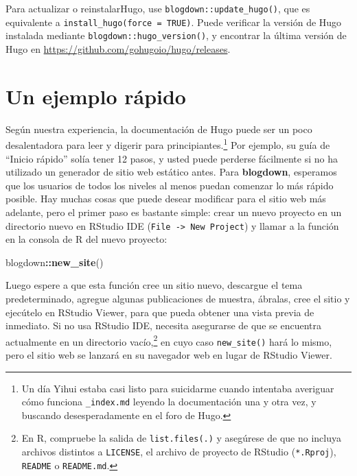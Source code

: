 \documentclass[12pt,]{krantz}
\makeatletter
\newenvironment{Shaded}{\begin{snugshade}}{\end{snugshade}}
\newcommand{\KeywordTok}[1]{\textcolor[rgb]{0.13,0.29,0.53}{\textbf{#1}}}
\newcommand{\NormalTok}[1]{#1}
\newcommand{\OperatorTok}[1]{\textcolor[rgb]{0.81,0.36,0.00}{\textbf{#1}}}
\newenvironment{kframe}{%
\medskip{}
\setlength{\fboxsep}{.8em}
 \def\at@end@of@kframe{}%
 \ifinner\ifhmode%
  \def\at@end@of@kframe{\end{minipage}}%
  \begin{minipage}{\columnwidth}%
 \fi\fi%
 \def\FrameCommand##1{\hskip\@totalleftmargin \hskip-\fboxsep
 \colorbox{shadecolor}{##1}\hskip-\fboxsep
     \hskip-\linewidth \hskip-\@totalleftmargin \hskip\columnwidth}%
 \MakeFramed {\advance\hsize-\width
   \@totalleftmargin\z@ \linewidth\hsize
   \@setminipage}}%
 {\par\unskip\endMakeFramed%
 \at@end@of@kframe}
\renewenvironment{Shaded}{\begin{kframe}}{\end{kframe}}
\theoremstyle{definition}
\theoremstyle{definition}
\theoremstyle{definition}
\theoremstyle{remark}
\makeatother
\begin{document}
Para actualizar o reinstalarHugo, use \texttt{blogdown::update\_hugo()},
que es equivalente a \texttt{install\_hugo(force\ =\ TRUE)}. Puede
verificar la versión de Hugo instalada mediante
\texttt{blogdown::hugo\_version()}, y encontrar la última versión de
Hugo en \url{https://github.com/gohugoio/hugo/releases}.

\hypertarget{un-ejemplo-rapido}{%
\section{Un ejemplo rápido}\label{un-ejemplo-rapido}}

Según nuestra experiencia, la documentación de Hugo puede ser un poco
desalentadora para leer y digerir para principiantes.\footnote{Un día
  Yihui estaba casi listo para suicidarme cuando intentaba averiguar
  cómo funciona \texttt{\_index.md} leyendo la documentación una y otra
  vez, y buscando desesperadamente en el foro de Hugo.} Por ejemplo, su
guía de ``Inicio rápido'' solía tener 12 pasos, y usted puede perderse
fácilmente si no ha utilizado un generador de sitio web estático antes.
Para \textbf{blogdown}, esperamos que los usuarios de todos los niveles
al menos puedan comenzar lo más rápido posible. Hay muchas cosas que
puede desear modificar para el sitio web más adelante, pero el primer
paso es bastante simple: crear un nuevo proyecto en un directorio nuevo
en RStudio IDE (\texttt{File\ -\textgreater{}\ New\ Project}) y llamar a
la función en la consola de R del nuevo
proyecto:

\begin{Shaded}
\begin{Highlighting}[]
\NormalTok{blogdown}\OperatorTok{::}\KeywordTok{new_site}\NormalTok{()}
\end{Highlighting}
\end{Shaded}

Luego espere a que esta función cree un sitio nuevo, descargue el tema
predeterminado, agregue algunas publicaciones de muestra, ábralas, cree
el sitio y ejecútelo en RStudio Viewer, para que pueda obtener una vista
previa de inmediato. Si no usa RStudio IDE, necesita asegurarse de que
se encuentra actualmente en un directorio vacío,\footnote{En R,
  compruebe la salida de
  \texttt{list.files(\textquotesingle{}.\textquotesingle{})} y asegúrese
  de que no incluya archivos distintos a \texttt{LICENSE}, el archivo de
  proyecto de RStudio (\texttt{*.Rproj}), \texttt{README} o
  \texttt{README.md}.} en cuyo caso \texttt{new\_site()} hará lo mismo,
pero el sitio web se lanzará en su navegador web en lugar de RStudio
Viewer.
\end{document}
